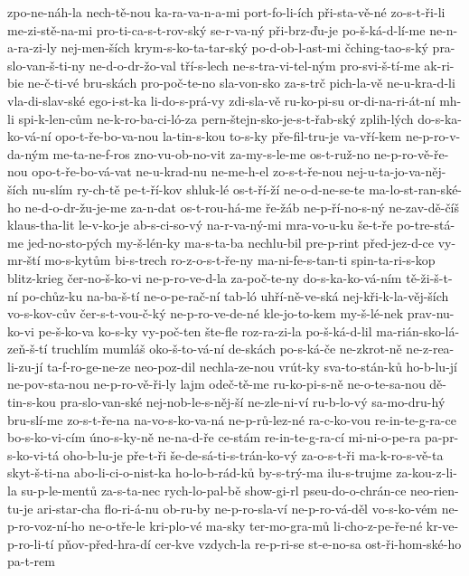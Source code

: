 zpo-ne-náh-la
nech-tě-nou
ka-ra-va-n-a-mi
port-fo-li-ích
při-sta-vě-né
zo-s-t-ři-li
me-zi-stě-na-mi
pro-ti-ca-s-t-rov-ský
se-r-va-ný
při-brz-ďu-je
po-š-ká-d-lí-me
ne-n-a-ra-zi-ly
nej-men-ších
krym-s-ko-ta-tar-ský
po-d-ob-l-ast-mi
čching-tao-s-ký
pra-slo-van-š-ti-ny
ne-d-o-dr-žo-val
tří-s-lech
ne-s-tra-vi-tel-ným
pro-svi-š-tí-me
ak-ri-bie
ne-č-ti-vé
bru-skách
pro-poč-te-no
sla-von-sko
za-s-trč
pich-la-vě
ne-u-kra-d-li
vla-di-slav-ské
ego-i-st-ka
li-do-s-prá-vy
zdi-sla-vě
ru-ko-pi-su
or-di-na-ri-át-ní
mh-li
spi-k-len-cům
ne-k-ro-ba-ci-ló-za
pern-štejn-sko-je-s-t-řab-ský
zplih-lých
do-s-ka-ko-vá-ní
opo-t-ře-bo-va-nou
la-tin-s-kou
to-s-ky
pře-fil-tru-je
va-vří-kem
ne-p-ro-v-da-ným
me-ta-ne-f-ros
zno-vu-ob-no-vit
za-my-s-le-me
os-t-ruž-no
ne-p-ro-vě-ře-nou
opo-t-ře-bo-vá-vat
ne-u-krad-nu
ne-me-h-el
zo-s-t-ře-nou
nej-u-ta-jo-va-něj-ších
nu-slím
ry-ch-tě
pe-t-ří-kov
shluk-lé
os-t-ří-ží
ne-o-d-ne-se-te
ma-lo-st-ran-ské-ho
ne-d-o-dr-žu-je-me
za-n-dat
os-t-rou-há-me
ře-žáb
ne-p-ří-no-s-ný
ne-zav-dě-číš
klaus-tha-lit
le-v-ko-je
ab-s-ci-so-vý
na-r-va-ný-mi
mra-vo-u-ku
še-t-ře
po-tre-stá-me
jed-no-sto-pých
my-š-lén-ky
ma-s-ta-ba
nechlu-bil
pre-p-rint
před-jez-d-ce
vy-mr-ští
mo-s-kytům
bi-s-trech
ro-z-o-s-t-ře-ny
ma-ni-fe-s-tan-ti
spin-ta-ri-s-kop
blitz-krieg
čer-no-š-ko-vi
ne-p-ro-ve-d-la
za-poč-te-ny
do-s-ka-ko-vá-ním
tě-ži-š-t-ní
po-chůz-ku
na-ba-š-tí
ne-o-pe-rač-ní
tab-ló
uhří-ně-ve-ská
nej-kři-k-la-věj-ších
vo-s-kov-cův
čer-s-t-vou-č-ký
ne-p-ro-ve-de-né
kle-jo-to-kem
my-š-lé-nek
prav-nu-ko-vi
pe-š-ko-va
ko-s-ky
vy-poč-ten
šte-fle
roz-ra-zi-la
po-š-ká-d-lil
ma-rián-sko-lá-zeň-š-tí
truchlím
mumláš
oko-š-to-vá-ní
de-skách
po-s-ká-če
ne-zkrot-ně
ne-z-rea-li-zu-jí
ta-f-ro-ge-ne-ze
neo-poz-dil
nechla-ze-nou
vrút-ky
sva-to-stán-ků
ho-b-lu-jí
ne-pov-sta-nou
ne-p-ro-vě-ři-ly
lajm
odeč-tě-me
ru-ko-pi-s-ně
ne-o-te-sa-nou
dě-tin-s-kou
pra-slo-van-ské
nej-nob-le-s-něj-ší
ne-zle-ni-ví
ru-b-lo-vý
sa-mo-dru-hý
bru-slí-me
zo-s-t-ře-na
na-vo-s-ko-va-ná
ne-p-rů-lez-né
ra-c-ko-vou
re-in-te-g-ra-ce
bo-s-ko-vi-cím
úno-s-ky-ně
ne-na-d-ře
ce-stám
re-in-te-g-ra-cí
mi-ni-o-pe-ra
pa-pr-s-ko-vi-tá
oho-b-lu-je
pře-t-ři
še-de-sá-ti-s-trán-ko-vý
za-o-s-t-ři
ma-k-ro-s-vě-ta
skyt-š-ti-na
abo-li-ci-o-nist-ka
ho-lo-b-rád-ků
by-s-trý-ma
ilu-s-trujme
za-kou-z-li-la
su-p-le-mentů
za-s-ta-nec
rych-lo-pal-bě
show-gi-rl
pseu-do-o-chrán-ce
neo-rien-tu-je
ari-star-cha
flo-ri-á-nu
ob-ru-by
ne-p-ro-sla-ví
ne-p-ro-vá-děl
vo-s-ko-vém
ne-p-ro-voz-ní-ho
ne-o-tře-le
kri-plo-vé
ma-sky
ter-mo-gra-mů
li-cho-z-pe-ře-né
kr-ve-p-ro-li-tí
pňov-před-hra-dí
cer-kve
vzdych-la
re-p-ri-se
st-e-no-sa
ost-ři-hom-ské-ho
pa-t-rem
